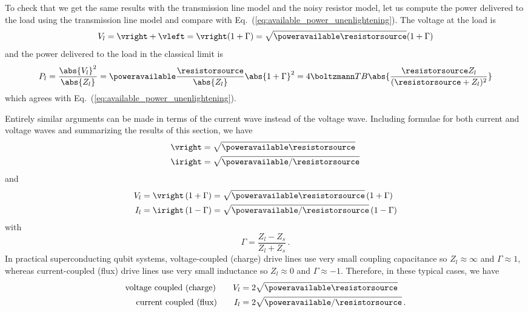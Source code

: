 To check that we get the same results with the transmission line model and the noisy resistor model, let us compute the power delivered to the load using the transmission line model and compare with Eq.~(\ref{eq:available_power_unenlightening}).
The voltage at the load is
\begin{equation}
  V_l = \vright + \vleft = \vright (1 + \Gamma) = \sqrt{\poweravailable \resistorsource}(1 + \Gamma) 
\end{equation}
and the power delivered to the load in the classical limit is
\begin{equation}
  P_l
  = \frac{\abs{V_l}^2}{\abs{Z_l}}
  = \poweravailable \frac{\resistorsource}{\abs{Z_l}} \abs{1 + \Gamma}^2
  = 4 \boltzmann T B \abs{\frac{\resistorsource Z_l}{(\resistorsource + Z_l)^2}}
\end{equation}
which agrees with Eq.~(\ref{eq:available_power_unenlightening}).


Entirely similar arguments can be made in terms of the current wave instead of the voltage wave.
Including formulae for both current and voltage waves and summarizing the results of this section, we have
\begin{align}
    \vright &= \sqrt{\poweravailable \resistorsource} \\
    \iright &= \sqrt{\poweravailable / \resistorsource}
\end{align}
and
\begin{align}
    V_l &= \vright \left( 1 + \Gamma \right) = \sqrt{\poweravailable \resistorsource} \left( 1 + \Gamma \right) \\
    I_l &= \iright \left( 1 - \Gamma \right) = \sqrt{\poweravailable / \resistorsource} \left( 1 - \Gamma \right)
\end{align}
with
\begin{equation}
    \Gamma = \frac{Z_l - Z_s}{Z_l + Z_s}
    \, .
\end{equation}
In practical superconducting qubit systems, voltage-coupled (charge) drive lines use very small coupling capacitance  so $Z_l \approx \infty$ and $\Gamma \approx 1$, whereas current-coupled (flux) drive lines use very small inductance so $Z_l \approx 0$ and $\Gamma \approx -1$.
Therefore, in these typical cases, we have
\begin{align}
  \text{voltage coupled (charge)} \qquad
  V_l &= 2 \sqrt{\poweravailable \resistorsource} \\
  \text{current coupled (flux)} \qquad
  I_l &= 2 \sqrt{\poweravailable / \resistorsource}
  \, .
\end{align}


